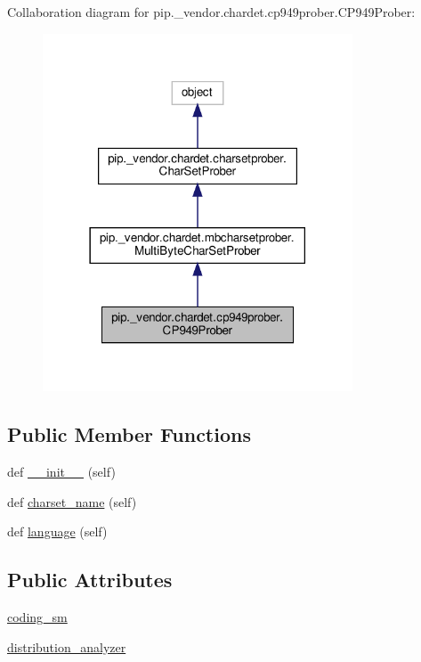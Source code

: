 Collaboration diagram for pip.\+\_\+vendor.\+chardet.\+cp949prober.\+C\+P949\+Prober\+:
\nopagebreak
\begin{figure}[H]
\begin{center}
\leavevmode
\includegraphics[width=261pt]{classpip_1_1__vendor_1_1chardet_1_1cp949prober_1_1CP949Prober__coll__graph}
\end{center}
\end{figure}
\subsection*{Public Member Functions}
\begin{DoxyCompactItemize}
\item 
def \hyperlink{classpip_1_1__vendor_1_1chardet_1_1cp949prober_1_1CP949Prober_a2252fb1a76b6c1b98a44cf2c73522787}{\+\_\+\+\_\+init\+\_\+\+\_\+} (self)
\item 
def \hyperlink{classpip_1_1__vendor_1_1chardet_1_1cp949prober_1_1CP949Prober_ad7b778982de18c472b8803a51414f693}{charset\+\_\+name} (self)
\item 
def \hyperlink{classpip_1_1__vendor_1_1chardet_1_1cp949prober_1_1CP949Prober_ac8fe448002c774b4ff5d8b7f0332fbb3}{language} (self)
\end{DoxyCompactItemize}
\subsection*{Public Attributes}
\begin{DoxyCompactItemize}
\item 
\hyperlink{classpip_1_1__vendor_1_1chardet_1_1cp949prober_1_1CP949Prober_a17e6369ef9b98d583d2c5436ab1a23c4}{coding\+\_\+sm}
\item 
\hyperlink{classpip_1_1__vendor_1_1chardet_1_1cp949prober_1_1CP949Prober_aa11cb25b182a139c02cc51d03118c876}{distribution\+\_\+analyzer}
\end{DoxyCompactItemize}
